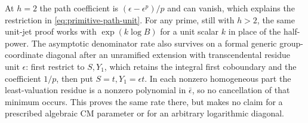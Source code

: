 \documentclass[11pt,a4paper]{article}
\theoremstyle{definition}\newtheorem{remark}[theorem]{Remark}
\begin{document}
At $h=2$ the path coefficient is $(\epsilon-\epsilon^p)/p$ and can vanish, which explains the restriction in \eqref{eq:primitive-path-unit}. For any prime, still with $h>2$, the same unit-jet proof works with $\exp(k\log B)$ for a unit scalar $k$ in place of the half-power. The asymptotic denominator rate also survives on a formal generic group-coordinate diagonal after an unramified extension with transcendental residue unit $\epsilon$: first restrict to $S,Y_1$, which retains the integral first coboundary and the coefficient $1/p$, then put $S=t,Y_1=\epsilon t$. In each nonzero homogeneous part the least-valuation residue is a nonzero polynomial in $\bar\epsilon$, so no cancellation of that minimum occurs. This proves the same rate there, but makes no claim for a prescribed algebraic CM parameter or for an arbitrary logarithmic diagonal.
\end{document}
